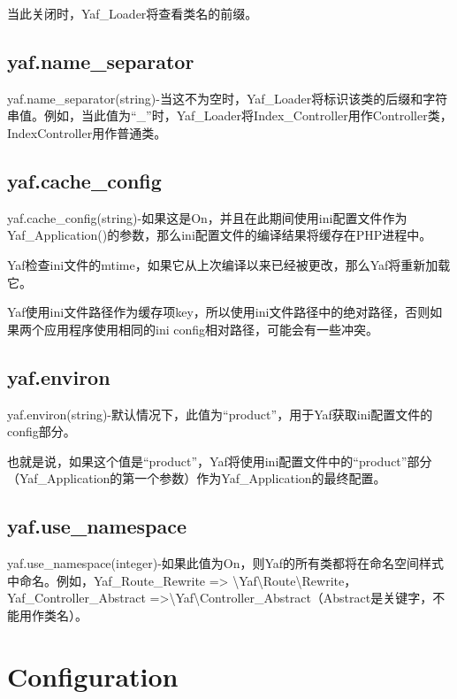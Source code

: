 当此关闭时，Yaf\_Loader将查看类名的前缀。

\subsection{yaf.name\_separator}

yaf.name\_separator(string)-当这不为空时，Yaf\_Loader将标识该类的后缀和字符串值。例如，当此值为“\_”时，Yaf\_Loader将Index\_Controller用作Controller类，IndexController用作普通类。

\subsection{yaf.cache\_config}

yaf.cache\_config(string)-如果这是On，并且在此期间使用ini配置文件作为Yaf\_Application()的参数，那么ini配置文件的编译结果将缓存在PHP进程中。

Yaf检查ini文件的mtime，如果它从上次编译以来已经被更改，那么Yaf将重新加载它。

Yaf使用ini文件路径作为缓存项key，所以使用ini文件路径中的绝对路径，否则如果两个应用程序使用相同的ini config相对路径，可能会有一些冲突。


\subsection{yaf.environ}

yaf.environ(string)-默认情况下，此值为“product”，用于Yaf获取ini配置文件的config部分。

也就是说，如果这个值是“product”，Yaf将使用ini配置文件中的“product”部分（Yaf\_Application的第一个参数）作为Yaf\_Application的最终配置。

\subsection{yaf.use\_namespace}

yaf.use\_namespace(integer)-如果此值为On，则Yaf的所有类都将在命名空间样式中命名。例如，Yaf\_Route\_Rewrite => \textbackslash Yaf\textbackslash Route\textbackslash Rewrite，Yaf\_Controller\_Abstract =>\textbackslash Yaf\textbackslash Controller\_Abstract（Abstract是关键字，不能用作类名）。






\section{Configuration}

